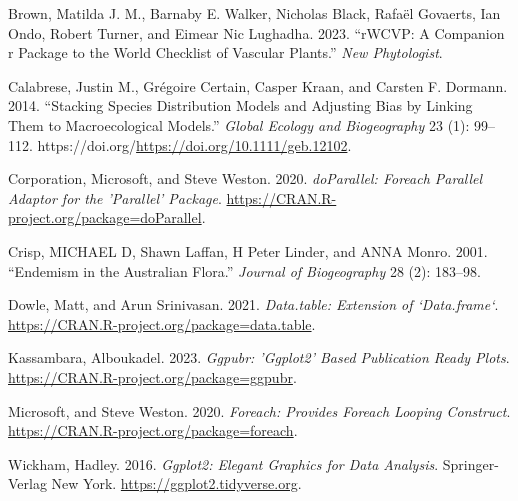 \documentclass[
]{article}
\newlength{\cslhangindent}
\newlength{\cslentryspacingunit} %
\newenvironment{CSLReferences}[2] %
 {%
  \setlength{\parindent}{0pt}
  \ifodd #1
  \let\oldpar\par
  \def\par{\hangindent=\cslhangindent\oldpar}
  \fi
  \setlength{\parskip}{#2\cslentryspacingunit}
 }%
 {}
\begin{document}
\hypertarget{refs}{}
\begin{CSLReferences}{1}{0}
\leavevmode{}%
Brown, Matilda J. M., Barnaby E. Walker, Nicholas Black, Rafaël
Govaerts, Ian Ondo, Robert Turner, and Eimear Nic Lughadha. 2023.
{``rWCVP: A Companion r Package to the World Checklist of Vascular
Plants.''} \emph{New Phytologist}.

\leavevmode{}%
Calabrese, Justin M., Grégoire Certain, Casper Kraan, and Carsten F.
Dormann. 2014. {``Stacking Species Distribution Models and Adjusting
Bias by Linking Them to Macroecological Models.''} \emph{Global Ecology
and Biogeography} 23 (1): 99--112.
https://doi.org/\url{https://doi.org/10.1111/geb.12102}.

\leavevmode{}%
Corporation, Microsoft, and Steve Weston. 2020. \emph{doParallel:
Foreach Parallel Adaptor for the 'Parallel' Package}.
\url{https://CRAN.R-project.org/package=doParallel}.

\leavevmode{}%
Crisp, MICHAEL D, Shawn Laffan, H Peter Linder, and ANNA Monro. 2001.
{``Endemism in the Australian Flora.''} \emph{Journal of Biogeography}
28 (2): 183--98.

\leavevmode{}%
Dowle, Matt, and Arun Srinivasan. 2021. \emph{Data.table: Extension of
`Data.frame`}. \url{https://CRAN.R-project.org/package=data.table}.

\leavevmode{}%
Kassambara, Alboukadel. 2023. \emph{Ggpubr: 'Ggplot2' Based Publication
Ready Plots}. \url{https://CRAN.R-project.org/package=ggpubr}.

\leavevmode{}%
Microsoft, and Steve Weston. 2020. \emph{Foreach: Provides Foreach
Looping Construct}. \url{https://CRAN.R-project.org/package=foreach}.

\leavevmode{}%
Wickham, Hadley. 2016. \emph{Ggplot2: Elegant Graphics for Data
Analysis}. Springer-Verlag New York.
\url{https://ggplot2.tidyverse.org}.

\end{CSLReferences}
\end{document}
